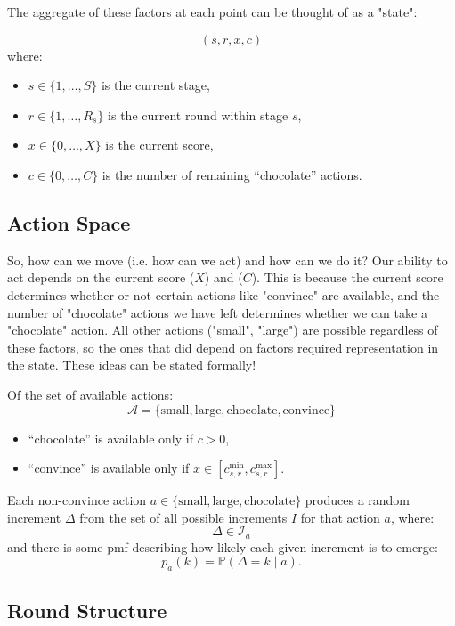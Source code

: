 \documentclass{article}
\begin{document}
The aggregate of these factors at each point can be thought of as a "state": 

\[
(s,r,x,c)
\]
where:
\begin{itemize}
    \item $s \in \{1,\dots,S\}$ is the current stage,
    \item $r \in \{1,\dots,R_s\}$ is the current round within stage $s$,
    \item $x \in \{0,\dots,X\}$ is the current score,
    \item $c \in \{0,\dots,C\}$ is the number of remaining ``chocolate'' actions.
\end{itemize}

\subsection{Action Space}

So, how can we move (i.e. how can we act) and how can we do it? Our ability to act depends on the current score ($X$) and ($C$).
This is because the current score determines whether or not certain actions like "convince" are available, and
the number of "chocolate" actions we have left determines whether we can take a "chocolate" action. All other
actions ("small", "large") are possible regardless of these factors, so the ones that did depend on factors
required representation in the state. These ideas can be stated formally!

Of the set of available actions:
\[
\mathcal{A} = \{\text{small}, \text{large}, \text{chocolate}, \text{convince}\}
\]
\begin{itemize}
    \item ``chocolate'' is available only if $c > 0$,
    \item ``convince'' is available only if $x \in [c_{s,r}^{\min}, c_{s,r}^{\max}]$.
\end{itemize}

Each non-convince action $a \in \{\text{small}, \text{large}, \text{chocolate}\}$ produces a random increment $\Delta$ from
the set of all possible increments $I$ for that action $a$, where:
\[
\Delta \in \mathcal{I}_a
\]
and there is some pmf describing how likely each given increment is to emerge:
\[
p_a(k) = \mathbb{P}(\Delta = k \mid a).
\]

\subsection{Round Structure}
\end{document}
